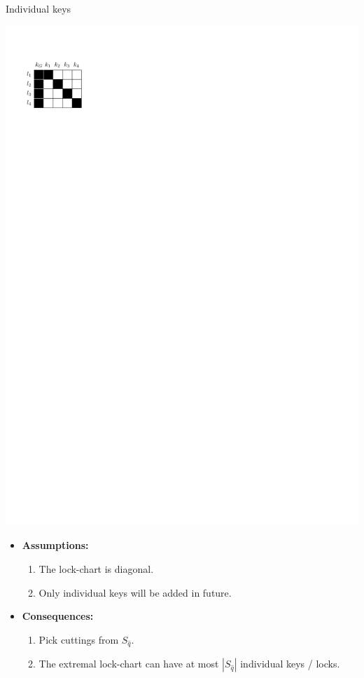 \begin{frame}{Individual keys}
  \begin{minipage}[t][180pt][t]{.35\textwidth}
    \bigskip

    \includegraphics{DiagonalLockChart.pdf}
  \end{minipage}
  \hfill
  \begin{minipage}[t][180pt][t]{.63\textwidth}
    \begin{itemize}
      \item \textbf{Assumptions:}
      \begin{enumerate}
        \item The lock-chart is diagonal.
        \item Only individual keys will be added in future.
      \end{enumerate}
      \item \textbf{Consequences:}
      \begin{enumerate}
        \item Pick cuttings from $S_{\hat{q}}$.
        \item The extremal lock-chart can have
        at most $|S_{\hat{q}}|$ individual keys / locks.
      \end{enumerate}
    \end{itemize}
  \end{minipage}
\end{frame}


